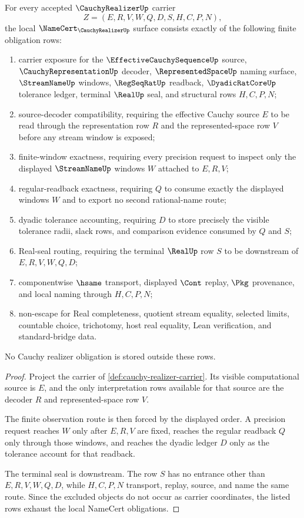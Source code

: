 \begin{theorem}
\label{thm:cauchy-realizer-namecert-obligations}
For every accepted $\CauchyRealizerUp$ carrier
$$
Z=(E,R,V,W,Q,D,S,H,C,P,N),
$$
the local $\NameCert_{\CauchyRealizerUp}$ surface consists exactly of the following finite obligation rows:
\begin{enumerate}
\item carrier exposure for the $\EffectiveCauchySequenceUp$ source, $\CauchyRepresentationUp$ decoder, $\RepresentedSpaceUp$ naming surface, $\StreamNameUp$ windows, $\RegSeqRatUp$ readback, $\DyadicRatCoreUp$ tolerance ledger, terminal $\RealUp$ seal, and structural rows $H,C,P,N$;
\item source-decoder compatibility, requiring the effective Cauchy source $E$ to be read through the representation row $R$ and the represented-space row $V$ before any stream window is exposed;
\item finite-window exactness, requiring every precision request to inspect only the displayed $\StreamNameUp$ windows $W$ attached to $E,R,V$;
\item regular-readback exactness, requiring $Q$ to consume exactly the displayed windows $W$ and to export no second rational-name route;
\item dyadic tolerance accounting, requiring $D$ to store precisely the visible tolerance radii, slack rows, and comparison evidence consumed by $Q$ and $S$;
\item Real-seal routing, requiring the terminal $\RealUp$ row $S$ to be downstream of $E,R,V,W,Q,D$;
\item componentwise $\hsame$ transport, displayed $\Cont$ replay, $\Pkg$ provenance, and local naming through $H,C,P,N$;
\item non-escape for Real completeness, quotient stream equality, selected limits, countable choice, trichotomy, host real equality, Lean verification, and standard-bridge data.
\end{enumerate}
No Cauchy realizer obligation is stored outside these rows.
\end{theorem}
\begin{proof}
Project the carrier of \autoref{def:cauchy-realizer-carrier}. Its visible computational source is $E$, and the only interpretation rows available for that source are the decoder $R$ and represented-space row $V$.

The finite observation route is then forced by the displayed order. A precision request reaches $W$ only after $E,R,V$ are fixed, reaches the regular readback $Q$ only through those windows, and reaches the dyadic ledger $D$ only as the tolerance account for that readback.

The terminal seal is downstream. The row $S$ has no entrance other than $E,R,V,W,Q,D$, while $H,C,P,N$ transport, replay, source, and name the same route. Since the excluded objects do not occur as carrier coordinates, the listed rows exhaust the local NameCert obligations.
\end{proof}


